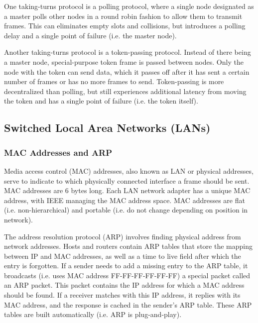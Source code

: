 \documentclass[12pt,titlepage]{article}
\begin{document}
        One taking-turns protocol is a polling protocol, where a single node designated as a master polls other nodes in a round robin fashion to allow them to
        transmit frames. This can eliminates empty slots and collisions, but introduces a polling delay and a single point of failure (i.e. the master node).

        Another taking-turns protocol is a token-passing protocol. Instead of there being a master node, special-purpose token frame is passed between nodes.
        Only the node with the token can send data, which it passes off after it has sent a certain number of frames or has no more frames to send. Token-passing
        is more decentralized than polling, but still experiences additional latency from moving the token and has a single point of failure (i.e. the token itself).

    \subsection{Switched Local Area Networks (LANs)}

      \subsubsection{MAC Addresses and ARP}
        Media access control (MAC) addresses, also known as LAN or physical addresses, serve to indicate to which physically connected interface a frame should be sent.
        MAC addresses are 6 bytes long. Each LAN network adapter has a unique MAC address, with IEEE managing the MAC address space. MAC addresses are flat
        (i.e. non-hierarchical) and portable (i.e. do not change depending on position in network).

        The address resolution protocol (ARP) involves finding physical address from network addresses. Hosts and routers contain ARP tables that store the mapping
        between IP and MAC addresses, as well as a time to live field after which the entry is forgotten. If a sender needs to add a missing entry to the ARP table,
        it broadcasts (i.e. uses MAC address FF-FF-FF-FF-FF-FF) a special packet called an ARP packet. This packet contains the IP address for which a MAC address
        should be found. If a receiver matches with this IP address, it replies with its MAC address, and the response is cached in the sender's ARP table. These
        ARP tables are built automatically (i.e. ARP is plug-and-play).
\end{document}
